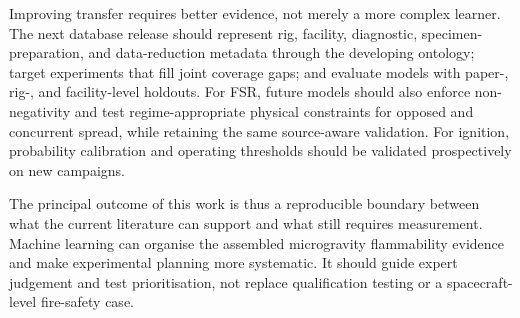 Improving transfer requires better evidence, not merely a more complex learner.
The next database release should represent rig, facility, diagnostic,
specimen-preparation, and data-reduction metadata through the developing
ontology; target experiments that fill joint coverage gaps; and evaluate models
with paper-, rig-, and facility-level holdouts. For FSR, future models should
also enforce non-negativity and test regime-appropriate physical constraints for
opposed and concurrent spread, while retaining the same source-aware validation.
For ignition, probability calibration and operating thresholds should be
validated prospectively on new campaigns.

The principal outcome of this work is thus a reproducible boundary between what
the current literature can support and what still requires measurement.
Machine learning can organise the assembled microgravity flammability evidence
and make experimental planning more systematic. It should guide expert
judgement and test prioritisation, not replace qualification testing or a
spacecraft-level fire-safety case.
